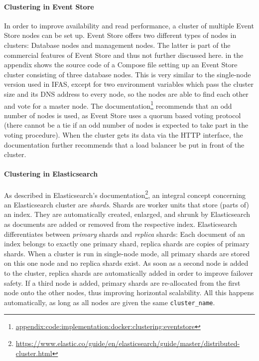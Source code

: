 \paragraph{Clustering in Event Store}
In order to improve availability and read performance, a cluster of multiple Event Store nodes can be set up.
Event Store offers two different types of nodes in clusters: Database nodes and management nodes.
The latter is part of the commercial features of Event Store and thus not further discussed here.
 in the appendix shows the source code of a Compose file setting up an Event Store cluster consisting of three database nodes.
This is very similar to the single-node version used in \ac{IFAS}, except for two environment variables which pass the cluster size and its DNS address to every node, so the nodes are able to find each other and vote for a master node.
The documentation\footnote{\url{appendix:code:implementation:docker:clustering:eventstore}} recommends that an odd number of nodes is used, as Event Store uses a quorum based voting protocol (there cannot be a tie if an odd number of nodes is expected to take part in the voting procedure).
When the cluster gets its data via the \ac{HTTP} interface, the documentation further recommends that a load balancer be put in front of the cluster.

\paragraph{Clustering in Elasticsearch}
As described in Elasticsearch's documentation\footnote{\url{https://www.elastic.co/guide/en/elasticsearch/guide/master/distributed-cluster.html}}, an integral concept concerning an Elasticsearch cluster are \emph{shards}.
Shards are worker units that store (parts of) an index.
They are automatically created, enlarged, and shrunk by Elasticsearch as documents are added or removed from the respective index.
Elasticsearch differentiates between \emph{primary} shards and \emph{replica} shards: Each document of an index belongs to exactly one primary shard, replica shards are copies of primary shards.
When a cluster is run in single-node mode, all primary shards are stored on this one node and no replica shards exist.
As soon as a second node is added to the cluster, replica shards are automatically added in order to improve failover safety.
If a third node is added, primary shards are re-allocated from the first node onto the other nodes, thus improving horizontal scalability.
All this happens automatically, as long as all nodes are given the same \texttt{cluster\_name}.


